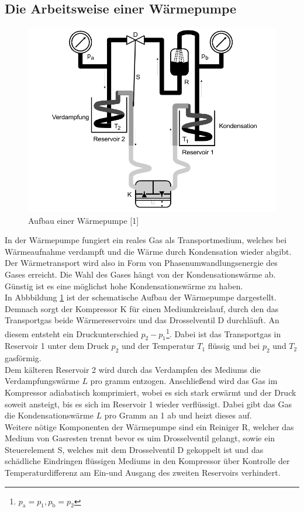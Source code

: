 \subsection{Die Arbeitsweise einer Wärmepumpe}
\begin{figure}
    \centering
    \includegraphics[scale=0.4]{aufbau.pdf}
    \caption{Aufbau einer Wärmepumpe [1]}
    \label{fig:aufbau}
\end{figure}
In der Wärmepumpe fungiert ein reales Gas als Transportmedium,
welches bei Wärmeaufnahme verdampft und die Wärme durch Kondensation wieder abgibt. Der Wärmetransport wird also in Form 
von Phasenumwandlungsenergie des Gases erreicht.
Die Wahl des Gases hängt von der Kondensationswärme ab. Günstig ist es eine möglichst hohe Kondensationswärme zu haben. \\
In Abbbildung \ref{fig:aufbau} ist der schematische Aufbau der Wärmepumpe dargestellt.
Demnach sorgt der Kompressor K für einen Mediumkreislauf, durch den das Transportgas beide Wärmereservoirs und das Drosselventil D durchläuft.
An diesem entsteht ein Druckunterschied $p_2-p_1$\footnote{$p_\text{a}=p_1, p_\text{b}=p_2$}. Dabei ist das Transportgas in Reservoir 1 unter dem Druck $p_2$
und der Temperatur $T_1$ flüssig und bei $p_2$ und $T_2$ gasförmig.\\
Dem kälteren Reservoir 2 wird durch das Verdampfen des Mediums die Verdampfungswärme $L$ pro gramm entzogen. 
Anschließend wird das Gas im Kompressor adiabatisch komprimiert, wobei es sich stark erwärmt und der Druck soweit ansteigt, bis es sich im Reservoir 1
wieder verflüssigt. Dabei gibt das Gas die Kondensationswärme $L$ pro Gramm an 1 ab und heizt dieses auf.\\
Weitere nötige Komponenten der Wärmepumpe sind ein Reiniger R, welcher das Medium von Gasresten trennt bevor es uim Drosselventil gelangt, sowie ein Steuerelement S,
welches mit dem Drosselventil D gekoppelt ist und das schädliche Eindringen flüssigen Mediums in den Kompressor über Kontrolle der Temperaturdifferenz
am Ein-und Ausgang des zweiten Reservoirs verhindert. 

